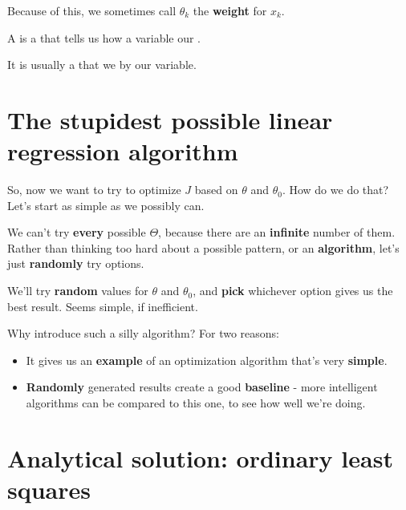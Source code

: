         
        Because of this, we sometimes call $\theta_k$ the \textbf{weight} for $x_k$.\\
        
        \begin{definition}
            A  is a  that tells us how  a variable  our .
            
            It is usually a  that we  by our variable.
        \end{definition}

\pagebreak

\section{The stupidest possible linear regression algorithm}
    
    So, now we want to try to optimize $J$ based on $\theta$ and $\theta_0$. How do we do that? Let's start as simple as we possibly can.
    
    We can't try \textbf{every} possible $\Theta$, because there are an \textbf{infinite} number of them. Rather than thinking too hard about a possible pattern, or an \textbf{algorithm}, let's just \textbf{randomly} try options.
    
    We'll try \textbf{random} values for $\theta$ and $\theta_0$, and \textbf{pick} whichever option gives us the best result. Seems simple, if inefficient.
    
    Why introduce such a silly algorithm? For two reasons:
    
    \begin{itemize}
        \item It gives us an \textbf{example} of an optimization algorithm that's very \textbf{simple}.
        \item \textbf{Randomly} generated results create a good \textbf{baseline} - more intelligent algorithms can be compared to this one, to see how well we're doing.
    \end{itemize}
    

\pagebreak

\section{Analytical solution: ordinary least squares}

